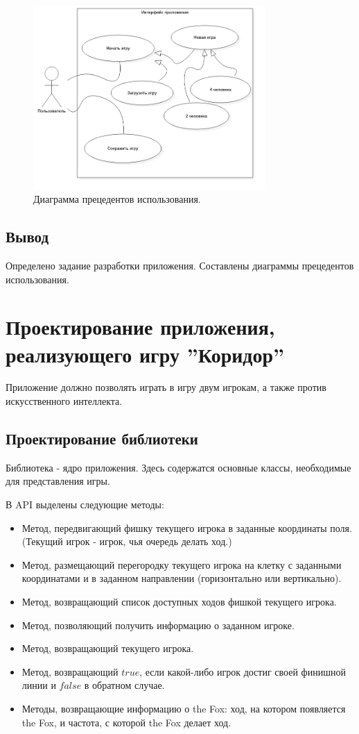 \documentclass[a4paper]{article}
\begin{document}
\begin{figure}[H]
	\begin{center}
		\includegraphics[scale=0.5, height=7cm]{../pictures/UseCaseDiagram2.png}
		\caption{Диаграмма прецедентов использования.} 
		\label{pic:UseCaseDiagram2} %
	\end{center}
\end{figure}

\subsection{Вывод}
Определено задание разработки приложения. Составлены диаграммы прецедентов использования.
\section{Проектирование приложения, реализующего игру ''Коридор''}
Приложение должно позволять играть в игру двум игрокам, а также против искусственного интеллекта.

\subsection{Проектирование библиотеки}
Библиотека  - ядро приложения. Здесь содержатся основные классы, необходимые для представления игры. 

\noindent В API выделены следующие методы: 
\begin{itemize}
\item Метод, передвигающий фишку текущего игрока в заданные координаты поля. (Текущий игрок - игрок, чья очередь делать ход.)
\item Метод, размещающий перегородку текущего игрока на клетку с заданными координатами и в заданном направлении (горизонтально или вертикально).
\item Метод, возвращающий список доступных ходов фишкой текущего игрока.
\item Метод, позволяющий получить информацию о заданном игроке.
\item Метод, возвращающий текущего игрока.
\item Метод, возвращающий $true$, если какой-либо игрок достиг своей финишной линии и $false$ в обратном случае.
\item Методы, возвращающие информацию о the Fox: ход, на котором появляется the Fox, и частота, с которой the Fox делает ход.
\end{itemize}
\end{document}
